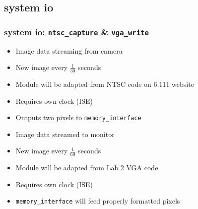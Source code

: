 \documentclass{beamer}
\begin{document}
\subsection{system io}
\begin{frame}
	\frametitle{system io: {\tt ntsc\_capture} \& {\tt vga\_write}}
		\begin{block}
			\begin{itemize}
				\item<2-> Image data streaming from camera
				\item<3-> New image every \(\frac{1}{30}\) seconds
				\item<4-> Module will be adapted from NTSC code on 6.111 website
				\item<5-> Requires own clock (ISE)
				\item<6-> Outputs two pixels to {\tt memory\_interface}
			\end{itemize}
		\end{block}

		\begin{block}
		\only<7->{{\tt vga\_write}}
			\begin{itemize}
				\item<8-> Image data streamed to monitor
				\item<9-> New image every \(\frac{1}{60}\) seconds
				\item<10-> Module will be adapted from Lab 2 VGA code
				\item<11-> Requires own clock (ISE)
				\item<12-> {\tt memory\_interface} will feed properly formatted pixels
			\end{itemize}
		\end{block}
\end{frame}

\end{document}
